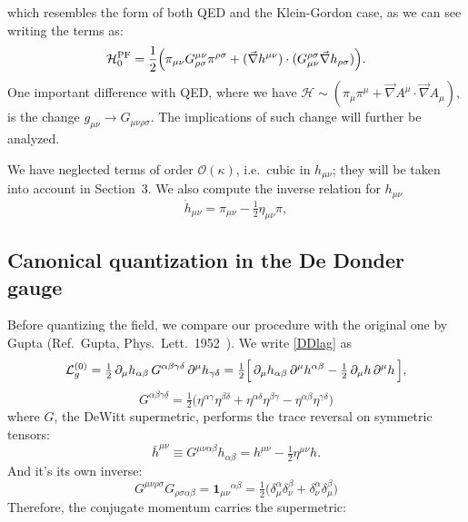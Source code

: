 \documentclass[12pt,a4paper,oneside]{article}
\numberwithin{equation}{section}   %
\begin{document}
which resembles the form of both QED and the Klein-Gordon case, as
we can see writing the terms as:
\begin{equation}
\mathcal{H}_0^{\mathrm{PF}}=\frac{1}{2}\Bigl(\pi_{\mu\nu}G^{\mu\nu}_{\rho\sigma}\pi^{\rho\sigma}
+(\vec\nabla h^{\mu\nu})\cdot(G_{\mu\nu}^{\rho\sigma}\vec\nabla h_{\rho\sigma})\Bigr).
\label{HPF2}
\end{equation}
One important difference with QED, where we have $\mathcal{H}\sim(\pi_\mu\pi^\mu+\vec{\nabla}A^\mu
\cdot\vec{\nabla}A_\mu)$, is the change $g_{\mu\nu}\to G_{\mu\nu\rho\sigma}$.
The implications of such change will further be analyzed.

We have neglected terms of order $\mathcal{O}(\kappa)$, i.e.\ cubic in
$h_{\mu\nu}$; they will be taken into account in Section~3.
We also compute the inverse relation for $h_{\mu\nu}$
\begin{equation}
\dot h_{\mu\nu}=\pi_{\mu\nu}-\tfrac12\eta_{\mu\nu}\pi,
\end{equation}

\subsection{Canonical quantization in the De Donder gauge}

Before quantizing the field, we compare our procedure with the original one by
Gupta (Ref.\ Gupta, Phys.\ Lett.\ 1952~\cite{Gupta1952}).
We write \eqref{DDlag} as
\begin{equation}
  \mathcal{L}^{(0)}_g
  = \tfrac{1}{2}\, \partial_\mu h_{\alpha\beta}\, G^{\alpha\beta\gamma\delta}\,
    \partial^\mu h_{\gamma\delta}
  = \tfrac{1}{2}\Bigl[\, \partial_\mu h_{\alpha\beta}\,\partial^\mu h^{\alpha\beta}
    - \tfrac{1}{2}\, \partial_\mu h\, \partial^\mu h \,\Bigr],
\end{equation}
\begin{equation}
\boxed{
  G^{\alpha\beta\gamma\delta}
  = \tfrac{1}{2}\bigl(\eta^{\alpha\gamma}\eta^{\beta\delta}
    + \eta^{\alpha\delta}\eta^{\beta\gamma}
    - \eta^{\alpha\beta}\eta^{\gamma\delta}\bigr)
}
\label{eq:G}
\end{equation}
where $G$, the DeWitt supermetric, performs the trace reversal on symmetric 
tensors:
\begin{equation}
  \bar{h}^{\mu\nu} \equiv G^{\mu\nu\alpha\beta} h_{\alpha\beta}
  = h^{\mu\nu} - \tfrac{1}{2}\eta^{\mu\nu} h .
\end{equation}
And it's its own inverse:
\begin{equation}
  G^{\mu\nu\rho\sigma}G_{\rho\sigma\alpha\beta}
  = \mathbf{1}_{\mu\nu}{}^{\alpha\beta}
  = \tfrac{1}{2}\bigl(\delta^{\alpha}_{\mu}\delta^{\beta}_{\nu}
                    + \delta^{\alpha}_{\nu}\delta^{\beta}_{\mu}\bigr)
\end{equation}
Therefore, the conjugate momentum carries the supermetric:
\end{document}
